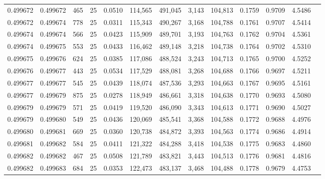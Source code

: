 \begin{tabular}{rrrrrrrrrrrrr}
0.499672 & 0.499672 &   465 &  25 &                                     0.0510 & 114,565 & 491,045 &   3,143 & 104,813 & 0.1759 & 0.9709 & 4.5486 \\
0.499672 & 0.499674 &   778 &  25 &                                     0.0311 & 115,343 & 490,267 &   3,168 & 104,788 & 0.1761 & 0.9707 & 4.5414 \\
0.499674 & 0.499674 &   566 &  25 &                                     0.0423 & 115,909 & 489,701 &   3,193 & 104,763 & 0.1762 & 0.9704 & 4.5361 \\
0.499674 & 0.499675 &   553 &  25 &                                     0.0433 & 116,462 & 489,148 &   3,218 & 104,738 & 0.1764 & 0.9702 & 4.5310 \\
0.499675 & 0.499676 &   624 &  25 &                                     0.0385 & 117,086 & 488,524 &   3,243 & 104,713 & 0.1765 & 0.9700 & 4.5252 \\
0.499676 & 0.499677 &   443 &  25 &                                     0.0534 & 117,529 & 488,081 &   3,268 & 104,688 & 0.1766 & 0.9697 & 4.5211 \\
0.499677 & 0.499677 &   545 &  25 &                                     0.0439 & 118,074 & 487,536 &   3,293 & 104,663 & 0.1767 & 0.9695 & 4.5161 \\
0.499677 & 0.499679 &   875 &  25 &                                     0.0278 & 118,949 & 486,661 &   3,318 & 104,638 & 0.1770 & 0.9693 & 4.5080 \\
0.499679 & 0.499679 &   571 &  25 &                                     0.0419 & 119,520 & 486,090 &   3,343 & 104,613 & 0.1771 & 0.9690 & 4.5027 \\
0.499679 & 0.499680 &   549 &  25 &                                     0.0436 & 120,069 & 485,541 &   3,368 & 104,588 & 0.1772 & 0.9688 & 4.4976 \\
0.499680 & 0.499681 &   669 &  25 &                                     0.0360 & 120,738 & 484,872 &   3,393 & 104,563 & 0.1774 & 0.9686 & 4.4914 \\
0.499681 & 0.499682 &   584 &  25 &                                     0.0411 & 121,322 & 484,288 &   3,418 & 104,538 & 0.1775 & 0.9683 & 4.4860 \\
0.499682 & 0.499682 &   467 &  25 &                                     0.0508 & 121,789 & 483,821 &   3,443 & 104,513 & 0.1776 & 0.9681 & 4.4816 \\
0.499682 & 0.499683 &   684 &  25 &                                     0.0353 & 122,473 & 483,137 &   3,468 & 104,488 & 0.1778 & 0.9679 & 4.4753 \\

\end{tabular}
